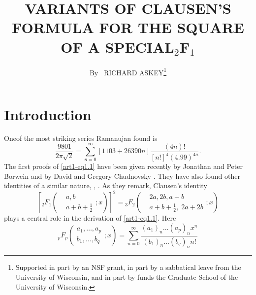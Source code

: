 
\title{VARIANTS OF CLAUSEN'S FORMULA FOR THE SQUARE OF A SPECIAL$_2$F$_1$}

\author{By~ RICHARD ASKEY\footnote{Supported in part by an NSF grant, in part by a sabbatical leave from the University of Wisconsin, and in part by funds the Graduate School of the University of Wisconsin.}}

\date{}
\maketitle

\section{Introduction}\label{art9-sec1}
One\pageoriginale of the most striking series Ramanujan \cite{art1-key10} found is 
\begin{equation}
\frac{9801}{2\pi\sqrt{2}} = \sum\limits^\infty_{n=0} [1103+26390n] \frac{(4n)!}{[n!]^4 (4.99)^{4n}}.\label{art1-eq1.1}
\end{equation}
The first proofs of \ref{art1-eq1.1} have been given recently by Jonathan and Peter Borwein \cite{art1-key3} and by David and Gregory Chudnovsky \cite{art1-key5}. They have also found other identities of a similar nature, \cite{art1-key4}, \cite{art1-key5}. As they remark, Clausen's identity \cite{art1-key6}
\begin{equation}
\left[{}_2 F_1 \left(
\begin{aligned}
& a, b\\
& a + b + \frac{1}{2}\end{aligned};x
\right) \right]^2 = {}_3 F_2 \left(
\begin{aligned}
& 2a, 2b, a + b \\
&  a+ b+ \frac{1}{2}, \; 2a+ 2 b 
\end{aligned} ;x
 \right)
\label{art1-eq1.2}
\end{equation}
plays a central role in the derivation of \eqref{art1-eq1.1}. Here 
\begin{equation}
{}_p F_p \left(
\begin{aligned}
a_1, \ldots, a_p\\
b_1, \ldots, b_q
\end{aligned}; x
\right) = \sum\limits^\infty_{n=0} \frac{(a_1)_n \ldots (a_p)_n x^n}{(b_1)_n \ldots (b_q)_n n!}
\label{art1-eq1.3}
\end{equation}
